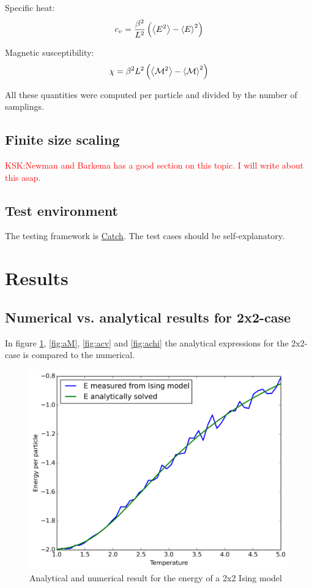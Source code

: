 \documentclass[11pt,a4paper,english]{article}
\numberwithin{equation}{section}
\newcommand{\magM}{\mathcal{M}}
\newcommand{\figurewidth}{.85\textwidth}
\begin{document}
Specific heat:
\begin{equation}
c_v = \frac{\beta^2}{L^2}\left(\expval{E^2} - \expval{E}^2\right)
\end{equation}

Magnetic susceptibility:
\begin{equation}
\chi = \beta^2 L^2 \left(\expval{\magM^2} - \expval{\magM}^2\right)
\end{equation}

All these quantities were computed per particle and divided by the number 
of samplings.

\subsection{Finite size scaling}
\textcolor{red}{KSK:Newman and Barkema has a good section on this topic. I will write about this asap.} 

\subsection{Test environment}

The testing framework is \href{https://github.com/philsquared/Catch}{Catch}.
The test cases should be self-explanatory.


\section{Results}

\subsection{Numerical vs. analytical results for 2x2-case}

In figure \ref{fig:aE}, \ref{fig:aM}, \ref{fig:acv} and \ref{fig:achi}
the analytical expressions for the 2x2-case is compared to the numerical.

\begin{figure}
\centering
\includegraphics[width=\figurewidth]{pics/pics4report/aE.png}
\caption{Analytical and numerical result for the energy 
of a 2x2 Ising model}
\label{fig:aE}
\end{figure}
\end{document}
